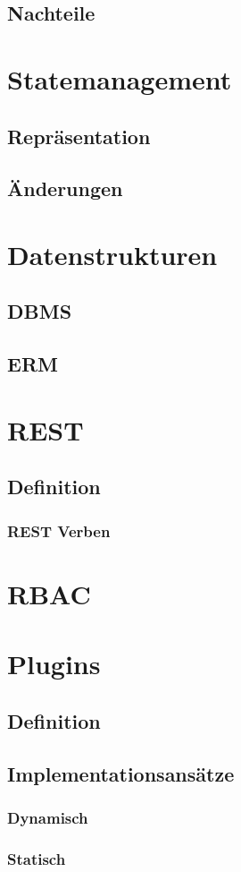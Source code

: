 \subsection{Nachteile}
\section{Statemanagement}
\subsection{Repräsentation}
\subsection{Änderungen}
\section{Datenstrukturen}
\subsection{\acl{DBMS}}
\subsection{\acl{ERM}}
\section{\acl{REST}}
\subsection{Definition}
\subsubsection{\acs{REST} Verben}
\section{\acl{RBAC}}
\section{Plugins}
\subsection{Definition}
\subsection{Implementationsansätze}
\subsubsection{Dynamisch}
\subsubsection{Statisch}